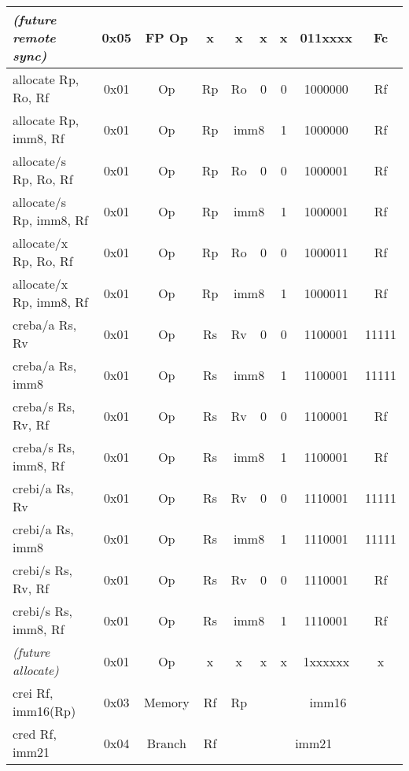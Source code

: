 \documentclass[a4paper,11pt]{article}
\begin{document}
\begin{table}
\begin{center}
{\begin{tabular}{|>{\ttfamily}l||c|c|c|c|c|c|c|c|}
\normalfont \emph{(future remote sync)} & 0x05 & FP Op & x & x & x & x & 011xxxx & Fc \\
\hline \hline
allocate Rp, Ro, Rf     & 0x01 & Op     & Rp &                    Ro & 0 & 0 & 1000000 & Rf \\ \cline{5-6}
allocate Rp, imm8, Rf   & 0x01 & Op     & Rp & \multicolumn{2}{c|}{imm8} & 1 & 1000000 & Rf \\ \cline{5-6}
allocate/s Rp, Ro, Rf   & 0x01 & Op     & Rp &                    Ro & 0 & 0 & 1000001 & Rf \\ \cline{5-6}
allocate/s Rp, imm8, Rf & 0x01 & Op     & Rp & \multicolumn{2}{c|}{imm8} & 1 & 1000001 & Rf \\ \cline{5-6}
allocate/x Rp, Ro, Rf   & 0x01 & Op     & Rp &                    Ro & 0 & 0 & 1000011 & Rf \\ \cline{5-6}
allocate/x Rp, imm8, Rf & 0x01 & Op     & Rp & \multicolumn{2}{c|}{imm8} & 1 & 1000011 & Rf \\ \cline{5-6}
\hline \hline
creba/a Rs, Rv          & 0x01 & Op     & Rs &                    Rv & 0 & 0 & 1100001 & 11111 \\ \cline{5-6}
creba/a Rs, imm8        & 0x01 & Op     & Rs & \multicolumn{2}{c|}{imm8} & 1 & 1100001 & 11111 \\ \cline{5-6}
creba/s Rs, Rv, Rf      & 0x01 & Op     & Rs &                    Rv & 0 & 0 & 1100001 & Rf \\ \cline{5-6}
creba/s Rs, imm8, Rf    & 0x01 & Op     & Rs & \multicolumn{2}{c|}{imm8} & 1 & 1100001 & Rf \\ \cline{5-6}
crebi/a Rs, Rv          & 0x01 & Op     & Rs &                    Rv & 0 & 0 & 1110001 & 11111 \\ \cline{5-6}
crebi/a Rs, imm8        & 0x01 & Op     & Rs & \multicolumn{2}{c|}{imm8} & 1 & 1110001 & 11111 \\ \cline{5-6}
crebi/s Rs, Rv, Rf      & 0x01 & Op     & Rs &                    Rv & 0 & 0 & 1110001 & Rf \\ \cline{5-6}
crebi/s Rs, imm8, Rf    & 0x01 & Op     & Rs & \multicolumn{2}{c|}{imm8} & 1 & 1110001 & Rf \\ \cline{5-6}
\hline \hline
\normalfont \emph{(future allocate)} & 0x01 & Op & x & x & x & x & 1xxxxxx & x \\
\hline\hline
crei  Rf, imm16(Rp)     & 0x03 & Memory & Rf & Rp & \multicolumn{4}{c|}{imm16} \\
\hline\hline
cred  Rf, imm21         & 0x04 & Branch & Rf & \multicolumn{5}{c|}{imm21} \\

\end{tabular}}
\end{center}
\end{table}
\end{document}
